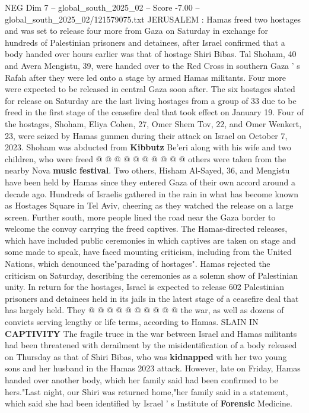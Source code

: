 \begin{textsample}{NEG Dim 7 – global\_south\_2025\_02 – Score -7.00 – global\_south\_2025\_02/121579075.txt}  \label{ex:f7_neg_267}
JERUSALEM : Hamas freed two hostages and was set to release four more from Gaza on Saturday in exchange for hundreds of Palestinian prisoners and detainees, after Israel confirmed that a body handed over hours earlier was that of hostage Shiri Bibas.
Tal Shoham, 40 and Avera Mengistu, 39, were handed over to the Red Cross in southern Gaza ' s Rafah after they were led onto a stage by armed Hamas militants.
Four more were expected to be released in central Gaza soon after.
The six hostages slated for release on Saturday are the last living hostages from a group of 33 due to be freed in the first stage of the ceasefire deal that took effect on January 19.
Four of the hostages, Shoham, Eliya Cohen, 27, Omer Shem Tov, 22, and Omer Wenkert, 23, were seized by Hamas gunmen during their attack on Israel on October 7, 2023.
Shoham was abducted from \textbf{Kibbutz} Be'eri along with his wife and two children, who were freed @ @ @ @ @ @ @ @ @ @ others were taken from the nearby Nova \textbf{music} \textbf{festival}.
Two others, Hisham Al-Sayed, 36, and Mengistu have been held by Hamas since they entered Gaza of their own accord around a decade ago.
Hundreds of Israelis gathered in the rain in what has become known as Hostages Square in Tel Aviv, cheering as they watched the release on a large screen.
Further south, more people lined the road near the Gaza border to welcome the convoy carrying the freed captives.
The Hamas-directed releases, which have included public ceremonies in which captives are taken on stage and some made to speak, have faced mounting criticism, including from the United Nations, which denounced the"parading of hostages".
Hamas rejected the criticism on Saturday, describing the ceremonies as a solemn show of Palestinian unity.
In return for the hostages, Israel is expected to release 602 Palestinian prisoners and detainees held in its jails in the latest stage of a ceasefire deal that has largely held.
They @ @ @ @ @ @ @ @ @ @ the war, as well as dozens of convicts serving lengthy or life terms, according to Hamas.
SLAIN IN \textbf{CAPTIVITY} The fragile truce in the war between Israel and Hamas militants had been threatened with derailment by the misidentification of a body released on Thursday as that of Shiri Bibas, who was \textbf{kidnapped} with her two young sons and her husband in the Hamas 2023 attack.
However, late on Friday, Hamas handed over another body, which her family said had been confirmed to be hers."Last night, our Shiri was returned home,"her family said in a statement, which said she had been identified by Israel ' s Institute of \textbf{Forensic} Medicine.

\end{textsample}
